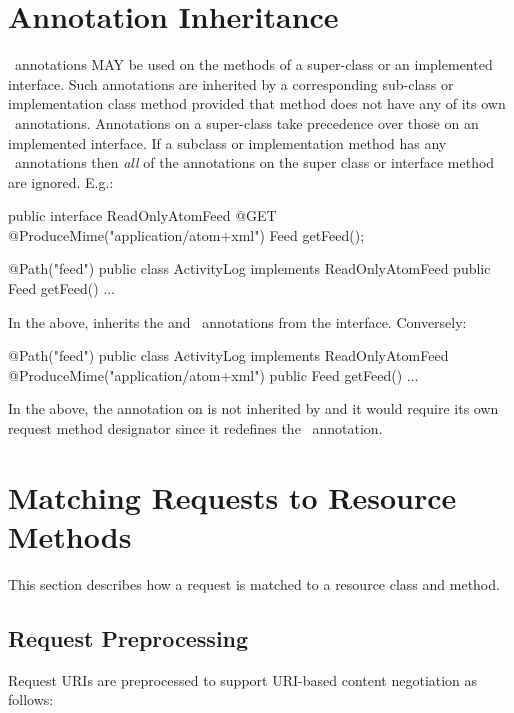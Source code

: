 \section{Annotation Inheritance}

\jaxrs\ annotations MAY be used on the methods of a super-class or an implemented interface. Such annotations are inherited by a corresponding sub-class or implementation class method provided that method does not have any of its own \jaxrs\ annotations. Annotations on a super-class take precedence over those on an implemented interface. If a subclass or implementation method has any \jaxrs\ annotations then {\em all} of the annotations on the super class or interface method are ignored. E.g.:

\begin{listing}{1}
public interface ReadOnlyAtomFeed {
  @GET @ProduceMime("application/atom+xml")
  Feed getFeed();
}

@Path("feed")
public class ActivityLog implements ReadOnlyAtomFeed {
  public Feed getFeed() {...}
}
\end{listing}

In the above,  inherits the  and \ProduceMime\ annotations from the interface. Conversely:

\begin{listing}{1}
@Path("feed")
public class ActivityLog implements ReadOnlyAtomFeed {
  @ProduceMime("application/atom+xml")
  public Feed getFeed() {...}
}
\end{listing}

In the above, the  annotation on  is not inherited by  and it would require its own request method designator since it redefines the \ProduceMime\ annotation.

\section{Matching Requests to Resource Methods}
\label{mapping_requests_to_java_methods}

This section describes how a request is matched to a resource class and method.

\subsection{Request Preprocessing}

Request URIs are preprocessed to support URI-based content negotiation as follows:

